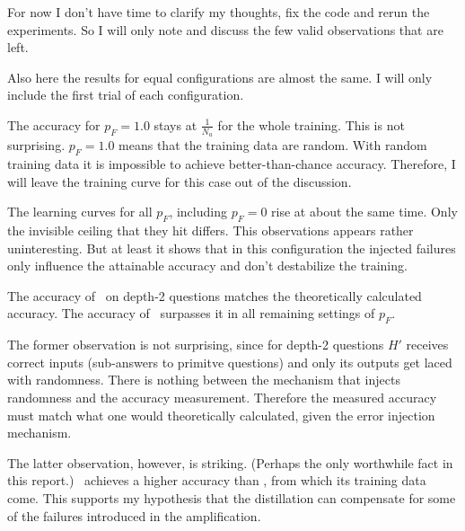 \documentclass{farlamp}
\begin{document}
For now I don't have time to clarify my thoughts, fix the code and rerun the
experiments. So I will only note and discuss the few valid observations that are
left.

\Obs Also here the results for equal configurations are almost the same.
\Disc I will only include the first trial of each configuration.

\Obs The accuracy for $p_F = 1.0$ stays at $\frac{1}{N_a}$ for the whole
training.
\Disc This is not surprising. $p_F = 1.0$ means that the training data are
random. With random training data it is impossible to achieve better-than-chance
accuracy. Therefore, I will leave the training curve for this case out of the
discussion.

\Obs The learning curves for all $p_F$, including $p_F = 0$ rise at about the
same time. Only the invisible ceiling that they hit differs.
\Disc This observations appears rather uninteresting. But at least it shows that
in this configuration the injected failures only influence the attainable
accuracy and don't destabilize the training.

\Obs The accuracy of \AmpHp\ on depth-2 questions matches the theoretically
calculated accuracy. The accuracy of \Xpa\ surpasses it in all remaining settings
of $p_F$.

\Disc The former observation is not surprising, since for depth-2 questions $H'$
receives correct inputs (sub-answers to primitve questions) and only its outputs
get laced with randomness. There is nothing between the mechanism that injects
randomness and the accuracy measurement. Therefore the measured accuracy must
match what one would theoretically calculated, given the error injection
mechanism.

The latter observation, however, is striking. (Perhaps the only worthwhile fact
in this report.) \Xpa\ achieves a higher accuracy than \AmpHp, from which its
training data come. This supports my hypothesis that the distillation can
compensate for some of the failures introduced in the amplification.

\end{document}
